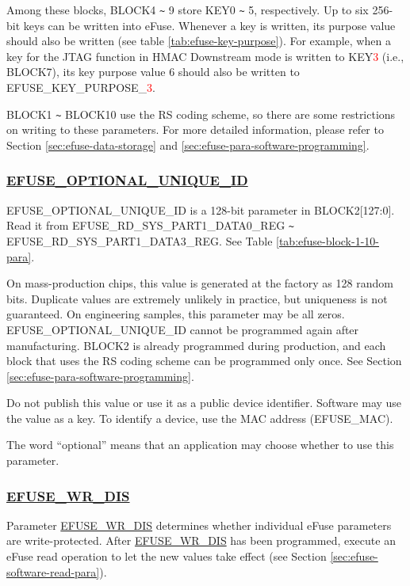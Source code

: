 \documentclass[main\_\_EN.tex]{subfiles}
\begin{document}
Among these blocks, BLOCK4 \verb+~+ 9 store KEY0 \verb+~+ 5, respectively. Up to six 256-bit keys can be written into eFuse. Whenever a key is written, its purpose value should also be written (see table \ref{tab:efuse-key-purpose}). For example, when a key for the JTAG function in HMAC Downstream mode is written to KEY\textcolor{red}{3} (i.e., BLOCK7), its key purpose value 6 should also be written to EFUSE\_KEY\_PURPOSE\_\textcolor{red}{3}.

BLOCK1 \verb+~+ BLOCK10 use the RS coding scheme, so there are some restrictions on writing to these parameters. For more detailed information, please refer to Section \ref{sec:efuse-data-storage} and \ref{sec:efuse-para-software-programming}.

\subsubsection{\texorpdfstring{\hyperref[fielddesc:EFUSEOPTIONALUNIQUEID]{EFUSE\_OPTIONAL\_UNIQUE\_ID}}{EFUSE\_OPTIONAL\_UNIQUE\_ID}}
\label{sec:efuse-optional-unique-id}

EFUSE\_OPTIONAL\_UNIQUE\_ID is a 128-bit parameter in BLOCK2[127:0]. Read it from EFUSE\_RD\_SYS\_PART1\_DATA0\_REG \verb+~+ EFUSE\_RD\_SYS\_PART1\_DATA3\_REG. See Table \ref{tab:efuse-block-1-10-para}.

On mass-production chips, this value is generated at the factory as 128 random bits. Duplicate values are extremely unlikely in practice, but uniqueness is not guaranteed. On engineering samples, this parameter may be all zeros. EFUSE\_OPTIONAL\_UNIQUE\_ID cannot be programmed again after manufacturing. BLOCK2 is already programmed during production, and each block that uses the RS coding scheme can be programmed only once. See Section \ref{sec:efuse-para-software-programming}.

Do not publish this value or use it as a public device identifier. Software may use the value as a key. To identify a device, use the MAC address (EFUSE\_MAC).

The word ``optional'' means that an application may choose whether to use this parameter.

\subsubsection{\hyperref[fielddesc:EFUSEWRDIS]{EFUSE\_WR\_DIS}}
\label{sec:efuse-wr-dis}

Parameter \hyperref[fielddesc:EFUSEWRDIS]{EFUSE\_WR\_DIS} determines whether individual eFuse parameters are write-protected. After \hyperref[fielddesc:EFUSEWRDIS]{EFUSE\_WR\_DIS} has been programmed, execute an eFuse read operation to let the new values take effect (see Section \ref{sec:efuse-software-read-para}).
\end{document}
